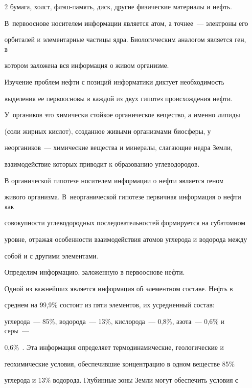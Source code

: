 \begin{multicols}{2}
бумага, холст, флэш-память, диск, другие физические материалы и нефть. 

В~первооснове носителем информации является атом, а точнее~--- электроны его 

орбиталей и элементарные частицы ядра. Биологическим аналогом является ген, в 

котором заложена вся информация о живом организме. 

     

     Изучение проблем нефти с позиций информатики диктует необходимость 

выделения ее первоосновы в каждой из двух гипотез происхождения нефти. 

У~органиков это химически стойкое органическое вещество, а именно липиды 

(соли жирных кислот), созданное живыми организмами биосферы, у 

     неоргаников~--- химические вещества и минералы, слагающие недра Земли, 

взаимодействие которых приводит к образованию углеводородов. 

     

     В органической гипотезе носителем информации о нефти является геном 

живого организма. В~неорганической гипотезе первичная информация о нефти как 

совокупности углеводородных последовательностей формируется на субатомном 

уровне, отражая особенности взаимодействия атомов углерода и водорода между 

собой и с другими элементами. 

     

     Определим информацию, заложенную в первооснове нефти. 

     

     Одной из важнейших является информация об элементном составе. Нефть в 

среднем на 99,9\% состоит из пяти элементов, их усредненный состав: 

углерода~--- 85\%, водорода~--- 13\%, кислорода~--- 0,8\%, азота~--- 0,6\% и серы~--- 

0,6\%~\cite{16s}. Эта информация определяет термодинамические, геологические и 

геохимические условия, обеспечившие концентрацию в одном веществе 85\% 

углерода и 13\% водорода. Глубинные зоны Земли могут обеспечить условия с 


\end{multicols}
